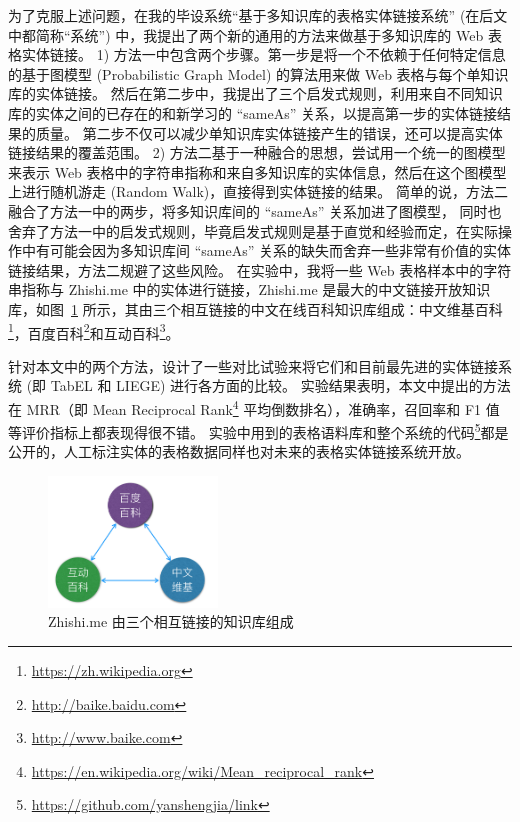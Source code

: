 为了克服上述问题，在我的毕设系统``基于多知识库的表格实体链接系统'' (在后文中都简称``系统'') 中，我提出了两个新的通用的方法来做基于多知识库的 Web 表格实体链接。
1) 方法一中包含两个步骤。第一步是将一个不依赖于任何特定信息的基于图模型 (Probabilistic Graph Model) 的算法用来做 Web 表格与每个单知识库的实体链接。
然后在第二步中，我提出了三个启发式规则，利用来自不同知识库的实体之间的已存在的和新学习的 ``sameAs'' 关系，以提高第一步的实体链接结果的质量。
第二步不仅可以减少单知识库实体链接产生的错误，还可以提高实体链接结果的覆盖范围。
2) 方法二基于一种融合的思想，尝试用一个统一的图模型来表示 Web 表格中的字符串指称和来自多知识库的实体信息，然后在这个图模型上进行随机游走 (Random Walk)，直接得到实体链接的结果。
简单的说，方法二融合了方法一中的两步，将多知识库间的 ``sameAs'' 关系加进了图模型，
同时也舍弃了方法一中的启发式规则，毕竟启发式规则是基于直觉和经验而定，在实际操作中有可能会因为多知识库间 ``sameAs'' 关系的缺失而舍弃一些非常有价值的实体链接结果，方法二规避了这些风险。
在实验中，我将一些 Web 表格样本中的字符串指称与 Zhishi.me\cite{niu2011zhishi} 中的实体进行链接，Zhishi.me 是最大的中文链接开放知识库，如图~\ref{zhishime_link} 所示，其由三个相互链接的中文在线百科知识库组成：中文维基百科\footnote{\url{https://zh.wikipedia.org}}，百度百科\footnote{\url{http://baike.baidu.com}}和互动百科\footnote{\url{http://www.baike.com}}。

针对本文中的两个方法，设计了一些对比试验来将它们和目前最先进的实体链接系统 (即 TabEL\cite{bhagavatula2015tabel} 和 LIEGE\cite{shen2012liege}) 进行各方面的比较。
实验结果表明，本文中提出的方法在 MRR（即 Mean Reciprocal Rank\footnote{\url{https://en.wikipedia.org/wiki/Mean_reciprocal_rank}} 平均倒数排名），准确率，召回率和 F1 值等评价指标上都表现得很不错。
实验中用到的表格语料库和整个系统的代码\footnote{\url{https://github.com/yanshengjia/link}}都是公开的，人工标注实体的表格数据同样也对未来的表格实体链接系统开放。\par

\begin{figure}[htbp]
\centering
\includegraphics[width=0.4\textwidth]{img/zhishime_link}
\caption{Zhishi.me 由三个相互链接的知识库组成}
\label{zhishime_link}
\end{figure}

